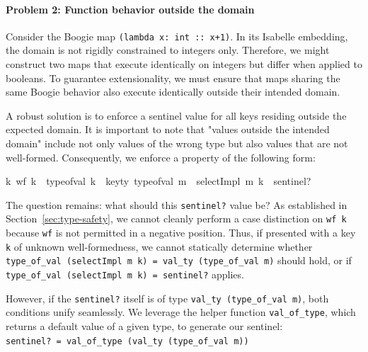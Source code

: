 \documentclass[11pt]{article}
\begin{document}
\paragraph{Problem 2: Function behavior outside the domain}
Consider the Boogie map \texttt{(lambda x: int :: x+1)}.
In its Isabelle embedding, the domain is not rigidly constrained to integers only.
Therefore, we might construct two maps that execute identically on integers but differ when applied to booleans.
To guarantee extensionality, we must ensure that maps sharing the same Boogie behavior also execute identically outside their intended domain. 

A robust solution is to enforce a sentinel value for all keys residing outside the expected domain.
It is important to note that "values outside the intended domain" include not only values of the wrong type but also values that are not well-formed.
Consequently, we enforce a property of the following form:

\begin{isabellebody}
{\isasymforall}k{\isachardot}{\kern0pt}\ {\isacharparenleft}{\kern0pt}{\isasymnot}wf\ k\ {\isasymor}\ type{\isacharunderscore}{\kern0pt}of{\isacharunderscore}{\kern0pt}val\ k\ {\isasymnoteq}\ key{\isacharunderscore}{\kern0pt}ty\ {\isacharparenleft}{\kern0pt}type{\isacharunderscore}{\kern0pt}of{\isacharunderscore}{\kern0pt}val\ m{\isacharparenright}{\kern0pt}{\isacharparenright}{\kern0pt}\ {\isasymlongrightarrow}\ {\isacharparenleft}{\kern0pt}selectImpl\ m\ k{\isacharparenright}{\kern0pt}\ {\isacharequal}{\kern0pt}\ sentinel?{\kern0pt}
\end{isabellebody}

The question remains: what should this \texttt{sentinel?} value be? As established in Section~\ref{sec:type-safety}, we cannot cleanly perform a case distinction on \texttt{wf k} because \texttt{wf} is not permitted in a negative position.
Thus, if presented with a key \texttt{k} of unknown well-formedness, we cannot statically determine whether \texttt{type\_of\_val (selectImpl m k) = val\_ty (type\_of\_val m)} should hold, or if \texttt{type\_of\_val (selectImpl m k) = sentinel?} applies. 

However, if the \texttt{sentinel?} itself is of type \texttt{val\_ty (type\_of\_val m)}, both conditions unify seamlessly.
We leverage the helper function \texttt{val\_of\_type}, which returns a default value of a given type, to generate our sentinel:\\
\texttt{sentinel? = val\_of\_type (val\_ty (type\_of\_val m))}
\end{document}
